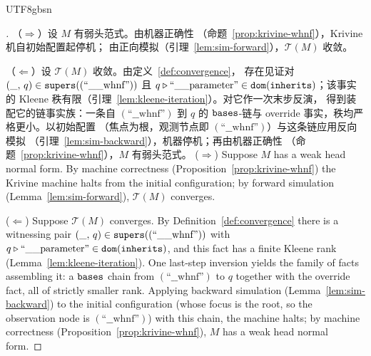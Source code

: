 \begin{CJK*}{UTF8}{gbsn}


\begin{proof}[]
  \ifPaperChinese
  （$\Rightarrow$）设 $M$ 有弱头范式。由机器正确性
  （命题~\ref{prop:krivine-whnf}），Krivine 机自初始配置起停机；
  由正向模拟（引理~\ref{lem:sim-forward}），$\mathcal{T}(M)$ 收敛。

  （$\Leftarrow$）设 $\mathcal{T}(M)$ 收敛。由定义~\ref{def:convergence}，
  存在见证对 $(\_,\, q) \in \mathtt{supers}((\text{``\_\_whnf''}))$ 且
  $q \mathbin{\triangleright} \text{``\_\_parameter''} \in \mathtt{dom}(\mathtt{inherits})$；该事实的
  Kleene 秩有限（引理~\ref{lem:kleene-iteration}）。对它作一次末步反演，
  得到装配它的链事实族：一条自 $(\text{``\_\_whnf''})$ 到 $q$ 的
  $\mathtt{bases}$-链与 override 事实，秩均严格更小。以初始配置
  （焦点为根，观测节点即 $(\text{``\_\_whnf''})$）与这条链应用反向模拟
  （引理~\ref{lem:sim-backward}），机器停机；再由机器正确性
  （命题~\ref{prop:krivine-whnf}），$M$ 有弱头范式。
  \else
  ($\Rightarrow$) Suppose $M$ has a weak head normal form. By machine
  correctness (Proposition~\ref{prop:krivine-whnf}) the Krivine
  machine halts from the initial configuration; by forward simulation
  (Lemma~\ref{lem:sim-forward}), $\mathcal{T}(M)$ converges.

  \begin{sloppypar}
  ($\Leftarrow$) Suppose $\mathcal{T}(M)$ converges. By
  Definition~\ref{def:convergence} there is a witnessing pair
  $(\_,\, q) \in \mathtt{supers}((\text{``\_\_whnf''}))$ with
  $q \mathbin{\triangleright} \text{``\_\_parameter''} \in \mathtt{dom}(\mathtt{inherits})$, and this fact
  has a finite Kleene rank (Lemma~\ref{lem:kleene-iteration}). One
  last-step inversion yields the family of facts assembling it: a
  $\mathtt{bases}$ chain from $(\text{``\_\_whnf''})$ to $q$ together with the
  override fact, all of strictly smaller rank. Applying backward
  simulation (Lemma~\ref{lem:sim-backward}) to the initial
  configuration (whose focus is the root, so the observation node is
  $(\text{``\_\_whnf''})$) with this chain, the machine halts; by machine
  correctness (Proposition~\ref{prop:krivine-whnf}), $M$ has a weak
  head normal form.
  \end{sloppypar}
  \fi
\end{proof}

\subsection{}


\end{CJK*}

